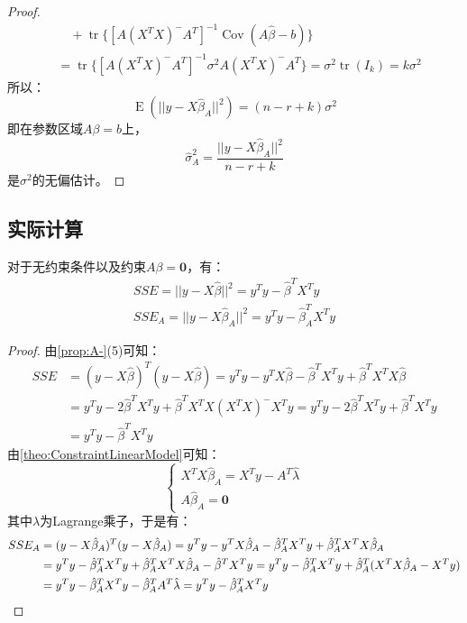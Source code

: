 \begin{proof}
\begin{align*}
		&\quad+\operatorname{tr}\{[A(X^TX)^-A^T]^{-1}\operatorname{Cov}(A\hat{\beta}-b)\} \\
		&=\operatorname{tr}\{[A(X^TX)^-A^T]^{-1}\sigma^2A(X^TX)^-A^T\}=\sigma^2\operatorname{tr}(I_k)=k\sigma^2
	\end{align*}
	所以：
	\begin{equation*}
		\operatorname{E}(||y-X\hat{\beta}_A||^2)=(n-r+k)\sigma^2
	\end{equation*}
	即在参数区域$A\beta=b$上，
	\begin{equation*}
		\hat{\sigma}_A^2=\frac{||y-X\hat{\beta}_A||^2}{n-r+k}
	\end{equation*}
	是$\sigma^2$的无偏估计。
\end{proof}

\subsection{实际计算}
\begin{theorem}\label{theo:SSESSEACalculate}
	对于无约束条件以及约束$A\beta=\mathbf{0}$，有：
	\begin{gather*}
		SSE=||y-X\hat{\beta}||^2=y^Ty-\hat{\beta}^TX^Ty \\
		SSE_A=||y-X\hat{\beta}_A||^2=y^Ty-\hat{\beta}_A^TX^Ty
	\end{gather*}
\end{theorem}
\begin{proof}
	由\cref{prop:A-}(5)可知：
	\begin{align*}
		SSE&=(y-X\hat{\beta})^T(y-X\hat{\beta})=y^Ty-y^TX\hat{\beta}-\hat{\beta}^TX^Ty+\hat{\beta}^TX^TX\hat{\beta} \\
		&=y^Ty-2\hat{\beta}^TX^Ty+\hat{\beta}^TX^TX(X^TX)^-X^Ty=y^Ty-2\hat{\beta}^TX^Ty+\hat{\beta}^TX^Ty \\
		&=y^Ty-\hat{\beta}^TX^Ty
	\end{align*}
	由\cref{theo:ConstraintLinearModel}可知：
	\begin{equation*}
		\begin{cases}
			X^TX\hat{\beta}_A=X^Ty-A^T\hat{\lambda} \\
			A\hat{\beta}_A=\mathbf{0}
		\end{cases}
	\end{equation*}
	其中$\lambda$为Lagrange乘子，于是有：
	\begin{align*}
		SSE_A&=(y-X\hat{\beta}_A)^T(y-X\hat{\beta}_A)=y^Ty-y^TX\hat{\beta}_A-\hat{\beta}_A^TX^Ty+\hat{\beta}_A^TX^TX\hat{\beta}_A \\
		&=y^Ty-\hat{\beta}_A^TX^Ty+\hat{\beta}_A^TX^TX\hat{\beta}_A-\hat{\beta}^TX^Ty=y^Ty-\hat{\beta}_A^TX^Ty+\hat{\beta}_A^T(X^TX\hat{\beta}_A-X^Ty) \\
		&=y^Ty-\hat{\beta}_A^TX^Ty-\hat{\beta}_A^TA^T\hat{\lambda}=y^Ty-\hat{\beta}_A^TX^Ty\qedhere
	\end{align*}
\end{proof}
